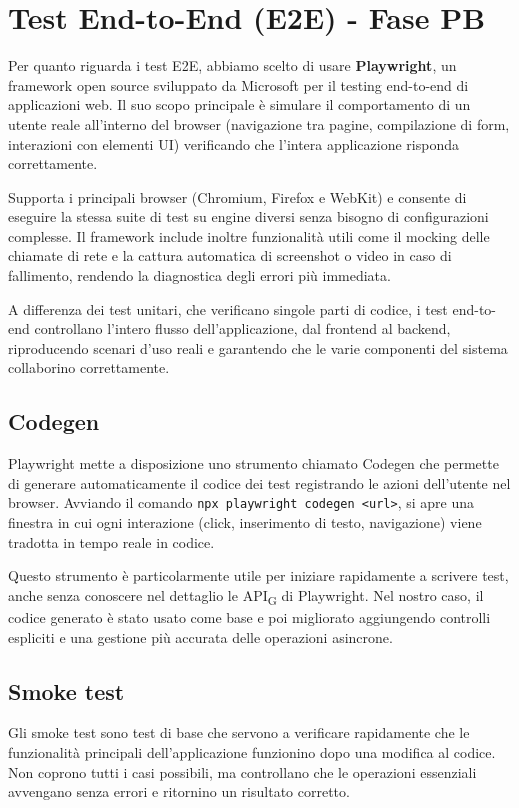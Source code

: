 \documentclass[11pt,a4paper]{article}
\newcommand{\gls}[1]{#1\textsubscript{G}}
\begin{document}
\newpage

\section{Test End-to-End (E2E) - Fase PB}
Per quanto riguarda i test E2E, abbiamo scelto di usare \textbf{Playwright}, un framework open source sviluppato da Microsoft per il testing end-to-end di applicazioni web. Il suo scopo principale è simulare il comportamento di un utente reale all'interno del browser (navigazione tra pagine, compilazione di form, interazioni con elementi UI) verificando che l'intera applicazione risponda correttamente.

Supporta i principali browser (Chromium, Firefox e WebKit) e consente di eseguire la stessa suite di test su engine diversi senza bisogno di configurazioni complesse. Il framework include inoltre funzionalità utili come il mocking delle chiamate di rete e la cattura automatica di screenshot o video in caso di fallimento, rendendo la diagnostica degli errori più immediata.

A differenza dei test unitari, che verificano singole parti di codice, i test end-to-end controllano l’intero flusso dell’applicazione, dal frontend al backend, riproducendo scenari d'uso reali e garantendo che le varie componenti del sistema collaborino correttamente.

\subsection{Codegen}
Playwright mette a disposizione uno strumento chiamato Codegen che permette di generare automaticamente il codice dei test registrando le azioni dell’utente nel browser. Avviando il comando \texttt{npx playwright codegen <url>}, si apre una finestra in cui ogni interazione (click, inserimento di testo, navigazione) viene tradotta in tempo reale in codice.

Questo strumento è particolarmente utile per iniziare rapidamente a scrivere test, anche senza conoscere nel dettaglio le \gls{API} di Playwright. Nel nostro caso, il codice generato è stato usato come base e poi migliorato aggiungendo controlli espliciti e una gestione più accurata delle operazioni asincrone.

\subsection{Smoke test}
Gli smoke test sono test di base che servono a verificare rapidamente che le funzionalità principali dell’applicazione funzionino dopo una modifica al codice. Non coprono tutti i casi possibili, ma controllano che le operazioni essenziali avvengano senza errori e ritornino un risultato corretto.
\end{document}
